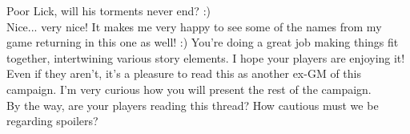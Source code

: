 Poor Lick, will his torments never end? :)\\

Nice... very nice! It makes me very happy to see some of the names from my game returning in this one as well! :) You're doing a great job making things fit together, intertwining various story elements. I hope your players are enjoying it!\\

Even if they aren't, it's a pleasure to read this as another ex-GM of this campaign. I'm very curious how you will present the rest of the campaign.\\

By the way, are your players reading this thread? How cautious must we be regarding spoilers?\\

 
